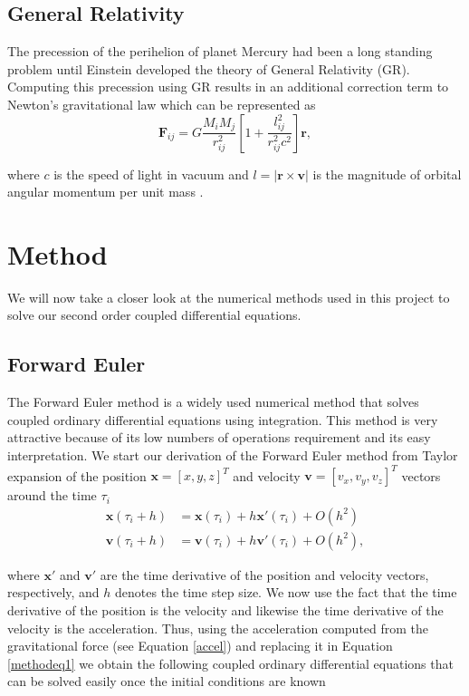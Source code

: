 \documentclass[a4paper]{article}
\begin{document}
\subsection{General Relativity}
The precession of the perihelion of planet Mercury had been a long standing problem until Einstein developed the theory of General Relativity (GR). Computing this precession using GR results in an additional correction term to Newton's gravitational law which can be represented as
\begin{equation}
\textbf{F}_{ij}= G\frac{M_i M_j}{r_{ij}^2}\left[ 1 + \frac{l_{ij}^2}{r_{ij}^2c^2} \right]\textbf{r},\label{GR_force}
\end{equation}

where $c$ is the speed of light in vacuum and $l=\vert\textbf{r} \times\textbf{v}\vert$ is the magnitude of  orbital angular momentum per unit mass \cite{giordano}.

\section{Method}

We will now take a closer look at the numerical methods used in this project to solve our second order coupled differential equations.

\subsection{Forward Euler}

The Forward Euler method is a widely used numerical method that solves coupled ordinary differential equations using integration. This method is very attractive because of its low numbers of operations requirement and its easy interpretation. We start our derivation of the Forward Euler method from Taylor expansion of the position $\mathbf{x}=[x,y,z]^T$ and velocity $\mathbf{v}=[v_x,v_y,v_z]^T$ vectors around the time $\tau_i$
\begin{align}
\mathbf{x}(\tau_i + h) &= \mathbf{x}(\tau_i) + h\mathbf{x}'(\tau_i) + O(h^{2}) \nonumber \\
\mathbf{v}(\tau_i + h) &= \mathbf{v}(\tau_i) + h\mathbf{v}'(\tau_i) + O(h^{2}), 
\label{methodeq1}
\end{align}

where $\mathbf{x}'$ and $\mathbf{v}'$ are the time derivative of the position and velocity vectors, respectively, and $h$ denotes the time step size. We now use the fact that the time derivative of the position is the velocity and likewise the time derivative of the velocity is the acceleration. Thus, using the acceleration computed from the gravitational force (see Equation \ref{accel}) and replacing it in Equation \ref{methodeq1} we obtain the following coupled ordinary differential equations that can be solved easily once the initial conditions are known 
\end{document}
